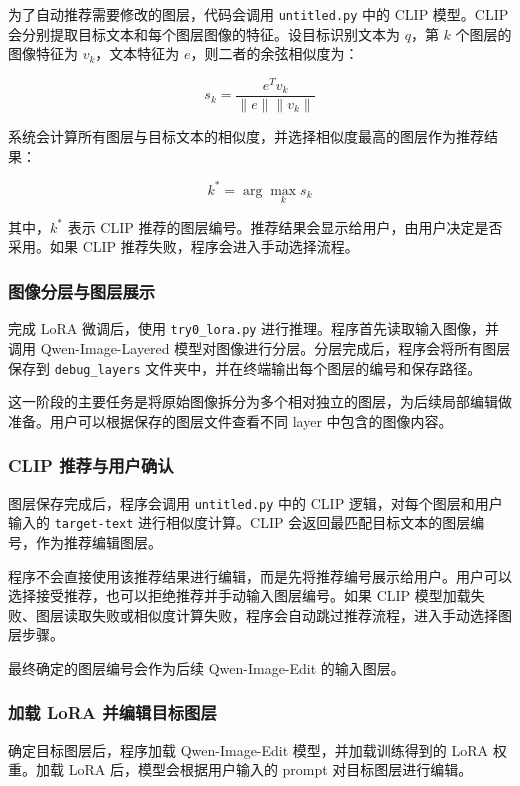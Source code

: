 \documentclass[UTF8,11pt,a4paper,fontset=fandol]{ctexart}
\begin{document}
为了自动推荐需要修改的图层，代码会调用 \texttt{untitled.py} 中的 CLIP 模型。CLIP 会分别提取目标文本和每个图层图像的特征。设目标识别文本为 \(q\)，第 \(k\) 个图层的图像特征为 \(v_k\)，文本特征为 \(e\)，则二者的余弦相似度为：

\[
s_k = \frac{e^T v_k}{\|e\| \|v_k\|}
\]

系统会计算所有图层与目标文本的相似度，并选择相似度最高的图层作为推荐结果：

\[
k^* = \arg\max_k s_k
\]

其中，\(k^*\) 表示 CLIP 推荐的图层编号。推荐结果会显示给用户，由用户决定是否采用。如果 CLIP 推荐失败，程序会进入手动选择流程。

\subsubsection{图像分层与图层展示}

完成 LoRA 微调后，使用 \texttt{try0\_lora.py} 进行推理。程序首先读取输入图像，并调用 Qwen-Image-Layered 模型对图像进行分层。分层完成后，程序会将所有图层保存到 \texttt{debug\_layers} 文件夹中，并在终端输出每个图层的编号和保存路径。

这一阶段的主要任务是将原始图像拆分为多个相对独立的图层，为后续局部编辑做准备。用户可以根据保存的图层文件查看不同 layer 中包含的图像内容。

\subsubsection{CLIP 推荐与用户确认}

图层保存完成后，程序会调用 \texttt{untitled.py} 中的 CLIP 逻辑，对每个图层和用户输入的 \texttt{target-text} 进行相似度计算。CLIP 会返回最匹配目标文本的图层编号，作为推荐编辑图层。

程序不会直接使用该推荐结果进行编辑，而是先将推荐编号展示给用户。用户可以选择接受推荐，也可以拒绝推荐并手动输入图层编号。如果 CLIP 模型加载失败、图层读取失败或相似度计算失败，程序会自动跳过推荐流程，进入手动选择图层步骤。

最终确定的图层编号会作为后续 Qwen-Image-Edit 的输入图层。

\subsubsection{加载 LoRA 并编辑目标图层}

确定目标图层后，程序加载 Qwen-Image-Edit 模型，并加载训练得到的 LoRA 权重。加载 LoRA 后，模型会根据用户输入的 prompt 对目标图层进行编辑。
\end{document}
